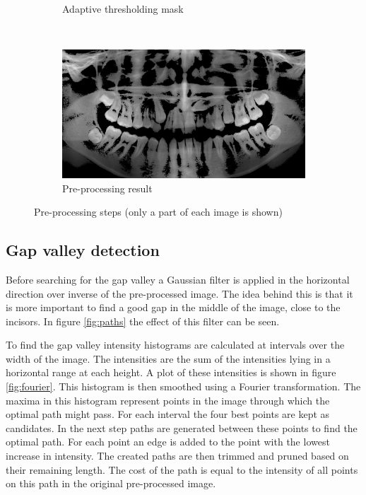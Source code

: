 \documentclass[a4paper,10pt]{article}
\begin{document}
\begin{figure}[htbp]
\begin{subfigure}{0.45\textwidth}
		\caption{Adaptive thresholding mask}
		\label{fig:ad_thresh}
	\end{subfigure}
	~
	\begin{subfigure}{0.45\textwidth}
		\centering
		\includegraphics[width=\textwidth, trim=20cm 5cm 20cm 10cm, clip]{result}
		\caption{Pre-processing result}
		\label{fig:result}
	\end{subfigure}
	\caption{Pre-processing steps (only a part of each image is shown)}
	\label{fig:pre_processing}
\end{figure}

\subsection{Gap valley detection}
Before searching for the gap valley a Gaussian filter is applied in the horizontal direction over inverse of the pre-processed image. The idea behind this is that it is more important to find a good gap in the middle of the image, close to the incisors. In figure \ref{fig:paths} the effect of this filter can be seen.

To find the gap valley intensity histograms are calculated at intervals over the width of the image. The intensities are the sum of the intensities lying in a horizontal range at each height. A plot of these intensities is shown in figure \ref{fig:fourier}. This histogram is then smoothed using a Fourier transformation. The maxima in this histogram represent points in the image through which the optimal path might pass. For each interval the four best points are kept as candidates. In the next step paths are generated between these points to find the optimal path. For each point an edge is added to the point with the lowest increase in intensity. The created paths are then trimmed and pruned based on their remaining length. The cost of the path is equal to the intensity of all points on this path in the original pre-processed image.
\end{document}
